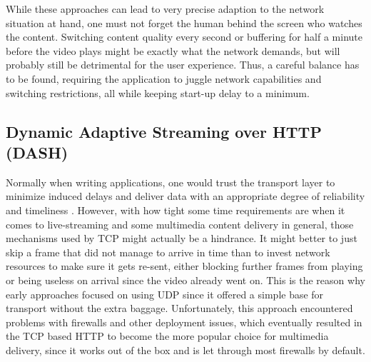 While these approaches can lead to very precise adaption to the network situation at hand, one must not forget the human behind the screen who watches the content. Switching content quality every second or buffering for half a minute before the video plays might be exactly what the network demands, but will probably still be detrimental for the user experience. Thus, a careful balance has to be found, requiring the application to juggle network capabilities and switching restrictions, all while keeping start-up delay to a minimum.

\subsection{Dynamic Adaptive Streaming over HTTP (DASH)}

Normally when writing applications, one would trust the transport layer to minimize induced delays and deliver data with an appropriate degree of reliability and timeliness \cite{KuAB17}. However, with how tight some time requirements are when it comes to live-streaming and some multimedia content delivery in general, those mechanisms used by TCP \cite{Poot81} might actually be a hindrance. It might better to just skip a frame that did not manage to arrive in time than to invest network resources to make sure it gets re-sent, either blocking further frames from playing or being useless on arrival since the video already went on. This is the reason why early approaches focused on using UDP \cite{Poot80} since it offered a simple base for transport without the extra baggage. Unfortunately, this approach encountered problems with firewalls and other deployment issues, which eventually resulted in the TCP based HTTP \cite{BePT15} to become the more popular choice for multimedia delivery, since it works out of the box and is let through most firewalls by default.  

 
